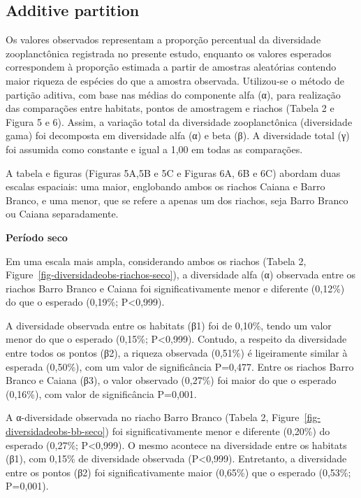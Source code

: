 \documentclass[
  letterpaper,
  DIV=11,
  numbers=noendperiod]{scrartcl}
\begin{document}
\subsection{Additive partition}\label{additive-partition}

Os valores observados representam a proporção percentual da diversidade
zooplanctônica registrada no presente estudo, enquanto os valores
esperados correspondem à proporção estimada a partir de amostras
aleatórias contendo maior riqueza de espécies do que a amostra
observada. Utilizou-se o método de partição aditiva, com base nas médias
do componente alfa (α), para realização das comparações entre habitats,
pontos de amostragem e riachos (Tabela 2 e Figura 5 e 6). Assim, a
variação total da diversidade zooplanctônica (diversidade gama) foi
decomposta em diversidade alfa (α) e beta (β). A diversidade total (γ)
foi assumida como constante e igual a 1,00 em todas as comparações.

A tabela e figuras (Figuras 5A,5B e 5C e Figuras 6A, 6B e 6C) abordam
duas escalas espaciais: uma maior, englobando ambos os riachos Caiana e
Barro Branco, e uma menor, que se refere a apenas um dos riachos, seja
Barro Branco ou Caiana separadamente.

\textbf{Período seco}

Em uma escala mais ampla, considerando ambos os riachos (Tabela 2,
Figure~\ref{fig-diversidadeobs-riachos-seco}), a diversidade alfa (α)
observada entre os riachos Barro Branco e Caiana foi significativamente
menor e diferente (0,12\%) do que o esperado (0,19\%; P\textless0,999).

A diversidade observada entre os habitats (β1) foi de 0,10\%, tendo um
valor menor do que o esperado (0,15\%; P\textless0,999). Contudo, a
respeito da diversidade entre todos os pontos (β2), a riqueza observada
(0,51\%) é ligeiramente similar à esperada (0,50\%), com um valor de
significância P=0,477. Entre os riachos Barro Branco e Caiana (β3), o
valor observado (0,27\%) foi maior do que o esperado (0,16\%), com valor
de significância P=0,001.

A α-diversidade observada no riacho Barro Branco (Tabela 2,
Figure~\ref{fig-diversidadeobs-bb-seco}) foi significativamente menor e
diferente (0,20\%) do esperado (0,27\%; P\textless0,999). O mesmo
acontece na diversidade entre os habitats (β1), com 0,15\% de
diversidade observada (P\textless0,999). Entretanto, a diversidade entre
os pontos (β2) foi significativamente maior (0,65\%) que o esperado
(0,53\%; P=0,001).
\end{document}
